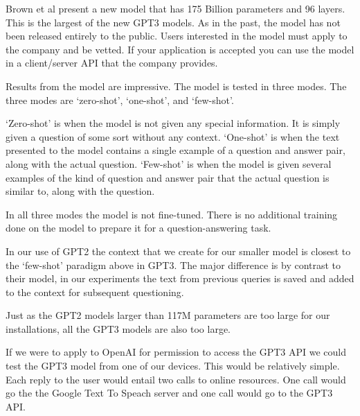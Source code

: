 Brown et al \cite{brown2020language} present a new model that has 175 Billion parameters and 96 layers. This is the largest of the new GPT3 models. As in the past, the model has not been released entirely to the public. Users interested in the model must apply to the company and be vetted. If your application is accepted you can use the model in a client/server API that the company provides.

Results from the model are impressive. The model is tested in three modes. The three modes are `zero-shot', `one-shot', and `few-shot'. 

`Zero-shot' is when the model is not given any special information. It is simply given a question of some sort without any context. `One-shot' is when the text presented to the model contains a single example of a question and answer pair, along with the actual question. `Few-shot' is when the model is given several examples of the kind of question and answer pair that the actual question is similar to, along with the question.

In all three modes the model is not fine-tuned. There is no additional training done on the model to prepare it for a question-answering task.

In our use of GPT2 the context that we create for our smaller model is closest to the `few-shot' paradigm above in GPT3. The major difference is by contrast to their model, in our experiments the text from previous queries is saved and added to the context for subsequent questioning.

Just as the GPT2 models larger than 117M parameters are too large for our installations, all the GPT3 models are also too large. 

If we were to apply to OpenAI for permission to access the GPT3 API we could test the GPT3 model from one of our devices. This would be relatively simple. Each reply to the user would entail two calls to online resources. One call would go the the Google Text To Speach server and one call would go to the GPT3 API.